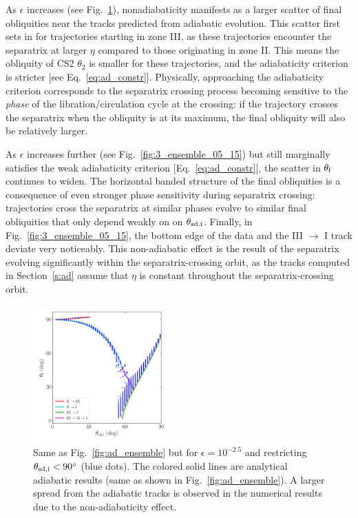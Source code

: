 \documentclass[twocolumn,twocolappendix]{aastex63}
\begin{document}
As $\epsilon$ increases (see Fig.~\ref{fig:3_ensemble_05_25}), nonadiabaticity
manifests as a larger scatter of final obliquities near the tracks predicted
from adiabatic evolution. This scatter first sets in for trajectories starting
in zone III, as these trajectories encounter the separatrix at larger $\eta$
compared to those originating in zone II\@. This means the obliquity of CS2
$\theta_2$ is smaller for these trajectories, and the adiabaticity criterion is
stricter [see Eq.~\eqref{eq:ad_constr}]. Physically, approaching the
adiabaticity criterion corresponds to the separatrix crossing process becoming
sensitive to the \emph{phase} of the libration/circulation cycle at the
crossing: if the trajectory crosses the separatrix when the obliquity is at its
maximum, the final obliquity will also be relatively larger.

As $\epsilon$ increases further (see Fig.~\ref{fig:3_ensemble_05_15}) but still
marginally satisfies the weak adiabaticity criterion [Eq.~\eqref{eq:ad_constr}],
the scatter in $\theta_{\rm f}$ continues to widen. The horizontal banded
structure of the final obliquities is a consequence of even stronger phase
sensitivity during separatrix crossing: trajectories cross the separatrix at
similar phases evolve to similar final obliquities that only depend weakly on
on $\theta_{\rm sd, i}$. Finally, in
Fig.~\ref{fig:3_ensemble_05_15}, the bottom edge of the data and the III $\to$ I
track deviate very noticeably. This non-adiabatic effect is the result of the
separatrix evolving significantly within the separatrix-crossing orbit, as the
tracks computed in Section~\ref{s:ad} assume that $\eta$ is constant throughout
the separatrix-crossing orbit.

\begin{figure}
    \centering
    \includegraphics[width=0.47\textwidth]{plots_diskdisp/3_ensemble_05_25.png}
    \caption{Same as Fig.~\ref{fig:ad_ensemble} but for $\epsilon = 10^{-2.5}$
    and restricting $\theta_{\rm sd, i} < 90^\circ$ (blue dots). The colored
    solid lines are analytical adiabatic results (same as shown in
    Fig.~\ref{fig:ad_ensemble}). A larger spread from the adiabatic tracks is
    observed in the numerical results due to the non-adiabaticity effect.
    }\label{fig:3_ensemble_05_25}
\end{figure}
\end{document}
